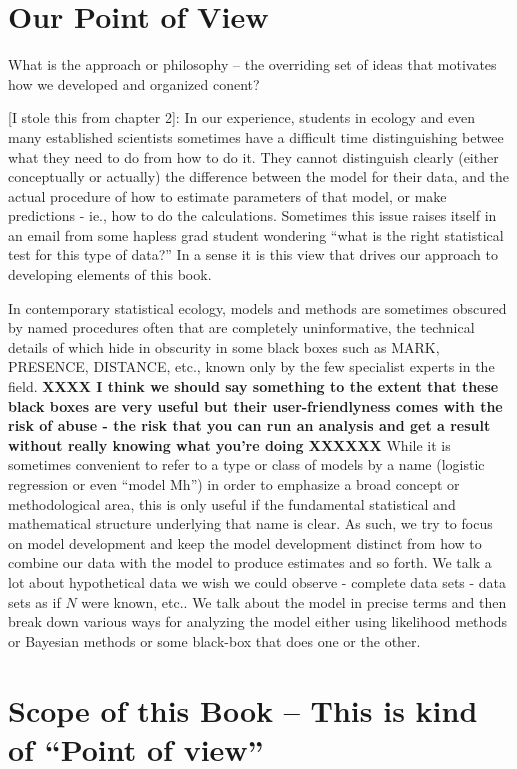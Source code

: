 \section*{Our Point of View}

What is the approach or philosophy -- the overriding set of ideas that
motivates how we developed and organized conent?

[I stole this from chapter 2]:
In our experience, students in ecology and even many established
scientists sometimes have a difficult time distinguishing
betwee what they need to do  from how to do
it.  They cannot distinguish clearly (either conceptually or actually)
the difference between the model for their data, and the actual
procedure of how to estimate parameters of that model, or make
predictions - ie., how to do the calculations. Sometimes this issue
raises itself in an email from some hapless grad student wondering
``what is the right statistical test for this type of data?''  In a
sense it is this view that drives our approach to developing elements
of this book.

In contemporary statistical ecology, models and methods are sometimes
obscured by named procedures often that are completely uninformative,
the technical details of which hide in obscurity in some black boxes
such as MARK, PRESENCE, DISTANCE, etc., known only by the few
specialist experts in the field.  {\bf XXXX I think we should say
  something to the extent that these black boxes are very useful but
  their user-friendlyness comes with the risk of abuse - the risk that
  you can run an analysis and get a result without really knowing what
  you're doing XXXXXX}  While it is sometimes convenient to refer to a
type or class of models by a name (logistic regression or even ``model
Mh'') in order to emphasize a broad concept or methodological area,
this is only useful if the fundamental statistical and mathematical
structure underlying that name is clear. As such, we try to focus on
model development and keep the model development distinct from how to
combine our data with the model to produce estimates and so forth. We
talk a lot about hypothetical data we wish we could observe - complete
data sets - data sets as if $N$ were known, etc.. We talk about the
model in precise terms and then break down various ways for analyzing
the model either using likelihood methods or Bayesian methods or some
black-box that does one or the other.



\section{Scope of this Book  
-- This is kind of ``Point of view''}

